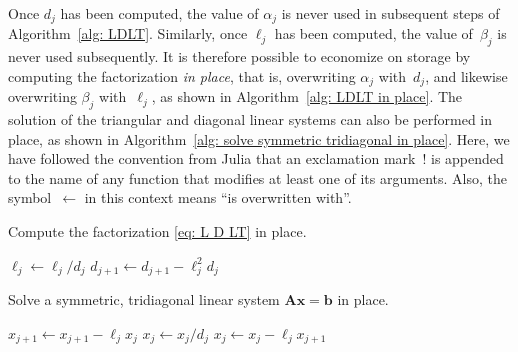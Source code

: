 Once $d_j$ has been computed, the value of $\alpha_j$ is never used in 
subsequent steps of Algorithm~\ref{alg: LDLT}. Similarly, once $\ell_j$ has been 
computed, the value of~$\beta_j$ is never used subsequently.  It is therefore 
possible to economize on storage by computing the factorization 
\emph{in place}, that is, overwriting $\alpha_j$ with~$d_j$,
and likewise overwriting $\beta_j$ with~$\ell_j$, as shown in 
Algorithm~\ref{alg: LDLT in place}.  The solution of the triangular and 
diagonal linear systems can also be performed in place, as shown in 
Algorithm~\ref{alg: solve symmetric tridiagonal in place}.  Here, we have 
followed the convention from Julia that an exclamation mark~! is appended to 
the name of any function that modifies at least one of its arguments.  Also, 
the symbol~$\gets$ in this context means ``is overwritten with''.

\begin{algorithm}
\caption{Compute the factorization \eqref{eq: L D LT} in place.}
\label{alg: LDLT in place}
\begin{algorithmic}
\Statex
{}
\State $\ell_j\gets\ell_j/d_j$
\State $d_{j+1}\gets d_{j+1}-\ell_j^2d_j$
\EndFor
\EndFunction
\end{algorithmic}
\end{algorithm}

\begin{algorithm}
\caption{Solve a symmetric, tridiagonal linear system 
$\boldsymbol{A}\boldsymbol{x}=\boldsymbol{b}$ in place.}
\label{alg: solve symmetric tridiagonal in place}
\begin{algorithmic}
\Statex
{}
    \State $x_{j+1}\gets x_{j+1}-\ell_jx_j$
\EndFor
{}
    \State $x_j\gets x_j/d_j$
\EndFor
{}
    \State $x_j\gets x_j-\ell_jx_{j+1}$
\EndFor
\EndFunction
\end{algorithmic}
\end{algorithm}

